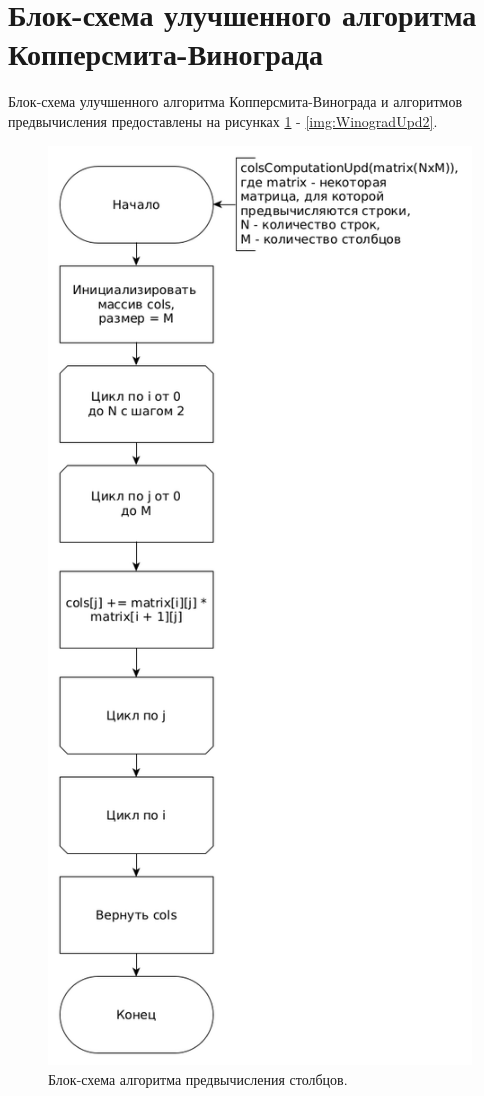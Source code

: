 \documentclass[12pt]{report}
\begin{document}
\section{Блок-схема улучшенного алгоритма Копперсмита-Винограда}
Блок-схема улучшенного алгоритма Копперсмита-Винограда и алгоритмов предвычисления предоставлены на рисунках \ref{img:colsUpd} - \ref{img:WinogradUpd2}.

\begin{figure}
\begin{center}
\includegraphics[scale=0.33]{inc/img/colsCompUpd.png}
\captionsetup{justification=centering}
	\caption{Блок-схема алгоритма предвычисления столбцов.}
	\label{img:colsUpd}	
\end{center}
\end{figure}
\end{document}
